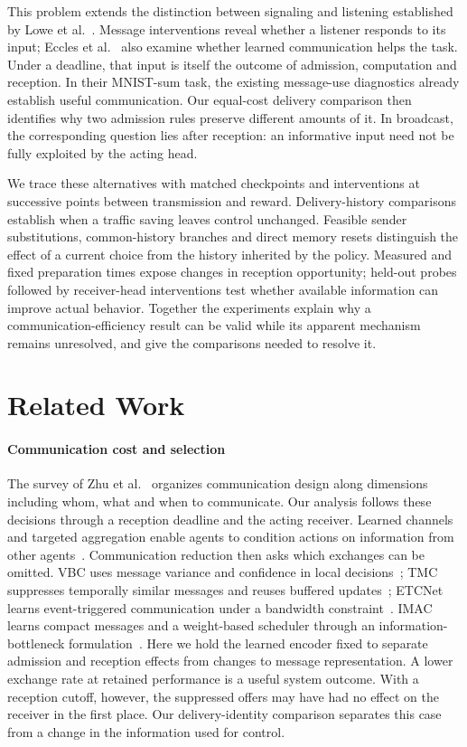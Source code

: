 \documentclass[a4paper,fleqn]{cas-dc}
\begin{document}
This problem extends the distinction between signaling and listening established by Lowe et al.~\citep{lowe2019pitfalls}. Message interventions reveal whether a listener responds to its input; Eccles et al.~\citep{eccles2019biases} also examine whether learned communication helps the task. Under a deadline, that input is itself the outcome of admission, computation and reception. In their MNIST-sum task, the existing message-use diagnostics already establish useful communication. Our equal-cost delivery comparison then identifies why two admission rules preserve different amounts of it. In broadcast, the corresponding question lies after reception: an informative input need not be fully exploited by the acting head.

We trace these alternatives with matched checkpoints and interventions at successive points between transmission and reward. Delivery-history comparisons establish when a traffic saving leaves control unchanged. Feasible sender substitutions, common-history branches and direct memory resets distinguish the effect of a current choice from the history inherited by the policy. Measured and fixed preparation times expose changes in reception opportunity; held-out probes followed by receiver-head interventions test whether available information can improve actual behavior. Together the experiments explain why a communication-efficiency result can be valid while its apparent mechanism remains unresolved, and give the comparisons needed to resolve it.

\section{Related Work}
\paragraph{Communication cost and selection}
The survey of Zhu et al.~\citep{zhu2024survey} organizes communication design along dimensions including whom, what and when to communicate. Our analysis follows these decisions through a reception deadline and the acting receiver.
Learned channels and targeted aggregation enable agents to condition actions on information from other agents~\citep{foerster2016learning,sukhbaatar2016learning,das2019tarmac}. Communication reduction then asks which exchanges can be omitted. VBC uses message variance and confidence in local decisions~\citep{zhang2019efficient}; TMC suppresses temporally similar messages and reuses buffered updates~\citep{zhang2020succinct}; ETCNet learns event-triggered communication under a bandwidth constraint~\citep{hu2023event}. IMAC learns compact messages and a weight-based scheduler through an information-bottleneck formulation~\citep{wang2020imac}. Here we hold the learned encoder fixed to separate admission and reception effects from changes to message representation. A lower exchange rate at retained performance is a useful system outcome. With a reception cutoff, however, the suppressed offers may have had no effect on the receiver in the first place. Our delivery-identity comparison separates this case from a change in the information used for control.
\end{document}

